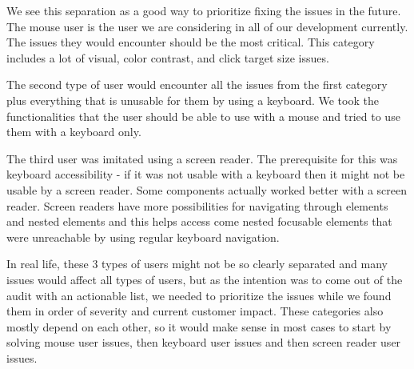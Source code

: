 \documentclass{master_thesis}
\begin{document}
We see this separation as a good way to prioritize fixing the issues in the future. The mouse user is the user we are considering in all of our development currently. The issues they would encounter should be the most critical. This category includes a lot of visual, color contrast, and click target size issues.

The second type of user would encounter all the issues from the first category plus everything that is unusable for them by using a keyboard. We took the functionalities that the user should be able to use with a mouse and tried to use them with a keyboard only.

The third user was imitated using a screen reader. The prerequisite for this was keyboard accessibility - if it was not usable with a keyboard then it might not be usable by a screen reader. Some components actually worked better with a screen reader. Screen readers have more possibilities for navigating through elements and nested elements and this helps access come nested focusable elements that were unreachable by using regular keyboard navigation.

In real life, these 3 types of users might not be so clearly separated and many issues would affect all types of users, but as the intention was to come out of the audit with an actionable list, we needed to prioritize the issues while we found them in order of severity and current customer impact. These categories also mostly depend on each other, so it would make sense in most cases to start by solving mouse user issues, then keyboard user issues and then screen reader user issues.
\end{document}
